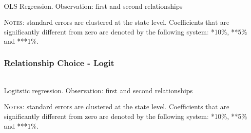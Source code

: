 \documentclass[12pt]{article}
\numberwithin{table}{section}
\begin{document}

	\begin{table}[htbp]\centering
	\caption{\\OLS Regression. Observation: first and second relationships}
	\label{table:wmarlinc}
	\begin{threeparttable}[t]\centering
	
	\begin{tablenotes}[flushleft]
	\footnotesize{\item \textsc{Notes}: standard errors are clustered at the state level.
		Coefficients that are significantly different from zero are denoted by the following system: *10\%, **5\%  and ***1\%.}
	\end{tablenotes}
	\end{threeparttable}
	\end{table}
\FloatBarrier

\FloatBarrier
\subsubsection*{Relationship Choice - Logit}

	\begin{table}[htbp]\centering
	\caption{\\Logitstic regression. Observation: first and second relationships}
	\label{table:wmar_logit}
	\begin{threeparttable}[t]\centering
	
	\begin{tablenotes}[flushleft]
	\footnotesize{\item \textsc{Notes}: standard errors are clustered at the state level.
		Coefficients that are significantly different from zero are denoted by the following system: *10\%, **5\%  and ***1\%.}
	\end{tablenotes}
	\end{threeparttable}
	\end{table}
\FloatBarrier
\end{document}
